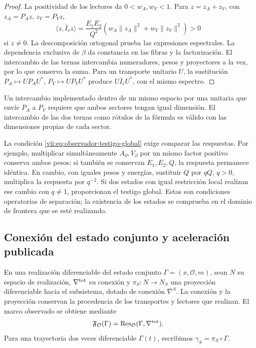 \begin{proof}
La positividad de los lectores da \(0<w_A,w_V<1\). Para
\(z=z_A+z_V\), con \(z_A=P_Az\), \(z_V=P_Vz\),
\[
 \langle z,\overline I_vz\rangle
 =\frac{E_1E_2}{Q^2}
   (w_A\|z_A\|^2+w_V\|z_V\|^2)>0
\]
si \(z\neq0\). La descomposición ortogonal prueba las expresiones
espectrales. La dependencia exclusiva de \(\beta\) da constancia
en las fibras y la factorización. El intercambio de las ternas
intercambia numeradores, pesos y proyectores a la vez, por lo que
conserva la suma. Para un transporte unitario \(U\), la sustitución
\(P_A\mapsto UP_AU^*\), \(P_V\mapsto UP_VU^*\) produce
\(U\overline I_vU^*\), con el mismo espectro.
\end{proof}

Un intercambio implementado dentro de un mismo espacio por una unitaria
que envíe \(P_A\) a \(P_V\) requiere que ambos sectores tengan
igual dimensión. El intercambio de las dos ternas como rótulos de la
fórmula es válido con las dimensiones propias de cada sector.

La condición \eqref{vii:eq:observador-testigo-global} exige comparar
las respuestas. Por ejemplo, multiplicar simultáneamente
\(A_\partial,V_\partial\) por un mismo factor positivo conserva
ambos pesos; si también se conservan \(E_1,E_2,Q\), la respuesta
permanece idéntica. En cambio, con iguales pesos y energías, sustituir
\(Q\) por \(qQ\), \(q>0\), multiplica la respuesta por \(q^{-2}\).
Si dos estados con igual restricción local realizan ese cambio con
\(q\neq1\), proporcionan el testigo global. Estas son condiciones
operatorias de separación; la existencia de los estados se comprueba
en el dominio de frontera que se esté realizando.

\subsection{Conexión del estado conjunto y aceleración publicada}
\label{vii:sec:observador-autoinercia}

En una realización diferenciable del estado conjunto
\(\Gamma=(x,\mathcal O,m)\), sean \(N\) su espacio de realización,
\(\nabla^{\rm tot}\) su conexión y \(\pi_S:N\to N_S\) una
proyección diferenciable hacia el subsistema, dotado de conexión
\(\nabla^S\). La conexión y la proyección conservan la procedencia
de los transportes y lectores que realizan. El marco observado se
obtiene mediante
\[
 \mathfrak F_{\mathcal O}(\Gamma)
 =\operatorname{Res}_{\mathcal O}(\Gamma,\nabla^{\rm tot}).
\]
Para una trayectoria dos veces diferenciable \(\Gamma(t)\),
escribimos \(\gamma_S=\pi_S\circ\Gamma\).

